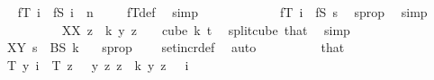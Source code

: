 \begin{isabellebody}
\ \isamarkupfalse%
\ {\isachardoublequoteopen}fT\ i\ {\isacharequal}{\kern0pt}\ fS\ {\isacharparenleft}{\kern0pt}i\ {\isacharminus}{\kern0pt}\ n{\isacharparenright}{\kern0pt}{\isachardoublequoteclose}\ \isamarkupfalse%
\ {}\ \isamarkupfalse%
\ fT{\isacharunderscore}{\kern0pt}def\ \isamarkupfalse%
\ simp\isanewline
\ \ \ \ \ \ \ \ \isamarkupfalse%
\ \isamarkupfalse%
\ {\isacharasterisk}{\kern0pt}{\isacharasterisk}{\kern0pt}{\isacharcolon}{\kern0pt}\ {\isachardoublequoteopen}fT\ i\ {\isacharequal}{\kern0pt}\ fS\ s{\isachardoublequoteclose}\ \isamarkupfalse%
\ s{\isacharunderscore}{\kern0pt}prop\ \isamarkupfalse%
\ simp\isanewline
\isanewline
\ \ \ \ \ \ \ \ \isamarkupfalse%
\ XX{\isacharcolon}{\kern0pt}\ {\isachardoublequoteopen}{\isacharparenleft}{\kern0pt}{\isasymlambda}z\ {\isasymin}\ {\isacharbraceleft}{\kern0pt}{\isachardot}{\kern0pt}{\isachardot}{\kern0pt}{\isacharless}{\kern0pt}k{\isacharbraceright}{\kern0pt}{\isachardot}{\kern0pt}\ y\ {\isacharparenleft}{\kern0pt}z\ {\isacharplus}{\kern0pt}\ {}{\isacharparenright}{\kern0pt}{\isacharparenright}{\kern0pt}\ {\isasymin}\ cube\ k\ {\isacharparenleft}{\kern0pt}t{\isacharplus}{\kern0pt}{}{\isacharparenright}{\kern0pt}{\isachardoublequoteclose}\ \isamarkupfalse%
\ split{\isacharunderscore}{\kern0pt}cube\ that\ \isamarkupfalse%
\ simp\isanewline
\ \ \ \ \ \ \ \ \isamarkupfalse%
\ XY{\isacharcolon}{\kern0pt}\ {\isachardoublequoteopen}s\ {\isasymin}\ BS\ k{\isachardoublequoteclose}\ \isamarkupfalse%
\ \ s{\isacharunderscore}{\kern0pt}prop\ \ {}\ \isamarkupfalse%
\ set{\isacharunderscore}{\kern0pt}incr{\isacharunderscore}{\kern0pt}def\ \isamarkupfalse%
\ auto\isanewline
\isanewline
\ \ \ \ \ \ \ \ \isamarkupfalse%
\ that\ \isamarkupfalse%
\ {\isachardoublequoteopen}T\ y\ i\ {\isacharequal}{\kern0pt}\ {\isacharparenleft}{\kern0pt}T{\isacharprime}{\kern0pt}\ {\isacharparenleft}{\kern0pt}{\isasymlambda}z\ {\isasymin}\ {\isacharbraceleft}{\kern0pt}{\isachardot}{\kern0pt}{\isachardot}{\kern0pt}{\isacharless}{\kern0pt}{}{\isacharbraceright}{\kern0pt}{\isachardot}{\kern0pt}\ y\ z{\isacharparenright}{\kern0pt}\ {\isacharparenleft}{\kern0pt}{\isasymlambda}z\ {\isasymin}\ {\isacharbraceleft}{\kern0pt}{\isachardot}{\kern0pt}{\isachardot}{\kern0pt}{\isacharless}{\kern0pt}k{\isacharbraceright}{\kern0pt}{\isachardot}{\kern0pt}\ y\ {\isacharparenleft}{\kern0pt}z\ {\isacharplus}{\kern0pt}\ {}{\isacharparenright}{\kern0pt}{\isacharparenright}{\kern0pt}{\isacharparenright}{\kern0pt}\ i{\isachardoublequoteclose}\ \isanewline

\end{isabellebody}
